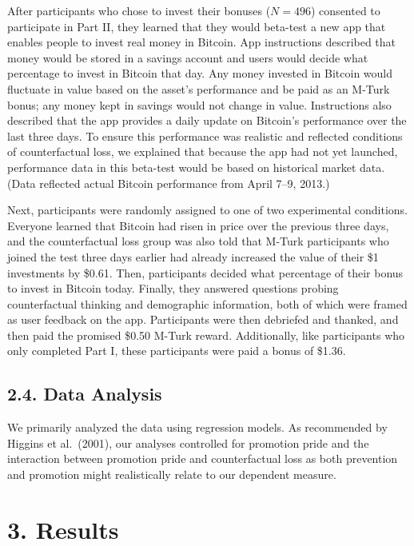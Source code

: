 \documentclass[man,floatsintext]{apa6}
\begin{document}
After participants who chose to invest their bonuses (\(N=496\)) consented to participate in Part II, they learned that they would beta-test a new app that enables people to invest real money in Bitcoin. App instructions described that money would be stored in a savings account and users would decide what percentage to invest in Bitcoin that day. Any money invested in Bitcoin would fluctuate in value based on the asset's performance and be paid as an M-Turk bonus; any money kept in savings would not change in value. Instructions also described that the app provides a daily update on Bitcoin's performance over the last three days. To ensure this performance was realistic and reflected conditions of counterfactual loss, we explained that because the app had not yet launched, performance data in this beta-test would be based on historical market data. (Data reflected actual Bitcoin performance from April 7--9, 2013.)

Next, participants were randomly assigned to one of two experimental conditions. Everyone learned that Bitcoin had risen in price over the previous three days, and the counterfactual loss group was also told that M-Turk participants who joined the test three days earlier had already increased the value of their \$1 investments by \$0.61. Then, participants decided what percentage of their bonus to invest in Bitcoin today. Finally, they answered questions probing counterfactual thinking and demographic information, both of which were framed as user feedback on the app. Participants were then debriefed and thanked, and then paid the promised \$0.50 M-Turk reward. Additionally, like participants who only completed Part I, these participants were paid a bonus of \$1.36.

\hypertarget{data-analysis}{%
\subsection{2.4. Data Analysis}\label{data-analysis}}

We primarily analyzed the data using regression models. As recommended by Higgins et al.~(2001), our analyses controlled for promotion pride and the interaction between promotion pride and counterfactual loss as both prevention and promotion might realistically relate to our dependent measure.

\hypertarget{results}{%
\section{3. Results}\label{results}}
\end{document}
